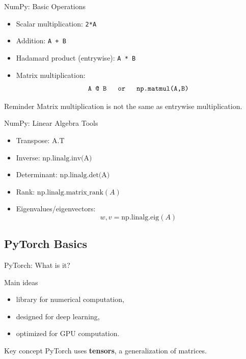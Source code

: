 \documentclass[aspectratio=169]{beamer}
\begin{document}
\begin{frame}{NumPy: Basic Operations}

\begin{itemize}
    \item Scalar multiplication: \texttt{2*A}
    \item Addition: \texttt{A + B}
    \item Hadamard product (entrywise): \texttt{A * B}
    \item Matrix multiplication:
\[
\texttt{A @ B \quad or \quad np.matmul(A,B)}
\]
\end{itemize}

\pause

\begin{alertblock}{Reminder}
Matrix multiplication is not the same as entrywise multiplication.
\end{alertblock}

\end{frame}

\begin{frame}{NumPy: Linear Algebra Tools}

\begin{itemize}
    \item Transpose: $\text{A.T}$
    \item Inverse: $\text{np.linalg.inv(A)}$
    \item Determinant: $\text{np.linalg.det(A)}$
    \item Rank: $\text{np.linalg.matrix\_rank}(A)$
    \item Eigenvalues/eigenvectors:
$$
w, v = \text{np.linalg.eig}(A)
$$
\end{itemize}

\end{frame}

\subsection{PyTorch Basics}

\begin{frame}{PyTorch: What is it?}

\begin{block}{Main ideas}
\begin{itemize}
    \item library for numerical computation,
    \item designed for deep learning,
    \item optimized for GPU computation.
\end{itemize}
\end{block}

\pause

\begin{alertblock}{Key concept}
PyTorch uses \textbf{tensors}, a generalization of matrices.
\end{alertblock}

\end{frame}
\end{document}
